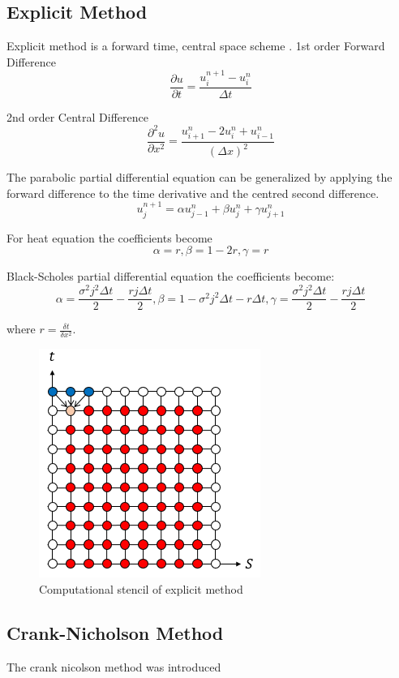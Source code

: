 \documentclass[12pt, oneside]{book}
\theoremstyle{plain}
\theoremstyle{definition}
\begin{document}
\subsection{Explicit Method}
Explicit method is a forward time, central space scheme .
1st order Forward Difference
$$ \frac{\partial u}{\partial t} = \frac{u^{n+1}_i - u^n_i}{\Delta t} $$

2nd order Central Difference 
$$ \frac{\partial^2 u}{\partial x^2} = \frac{u^n_{i+1}- 2u^n_i + u^n_{i-1}}{(\Delta x)^2} $$

The parabolic partial differential equation can be generalized by applying the forward difference to the time derivative and the centred second difference.
$$ u_j^{n+1} = \alpha u_{j-1}^{n} + \beta u_{j}^{n} + \gamma u_{j+1}^{n} $$

For heat equation the coefficients become
$$ \alpha =  r, \beta = 1 - 2r, \gamma = r $$

Black-Scholes partial differential equation the coefficients become:
$$ \alpha =  \frac{\sigma^2 j^2 \Delta t}{2} - \frac{r j \Delta t}{2}, \beta = 1 - \sigma^2 j^2 \Delta t - r \Delta t, \gamma = \frac{\sigma^2 j^2 \Delta t}{2} - \frac{r j \Delta t}{2} $$

where $ r = \frac{\delta t}{\delta x^2} $.

    \begin{figure}[!htb]
        \centering
            \includegraphics[scale=0.9]{Explicit.png}
        \caption{Computational stencil of explicit method}
    \end{figure}

\subsection{Crank-Nicholson Method}
The crank nicolson method was introduced \cite{cn}
\end{document}
